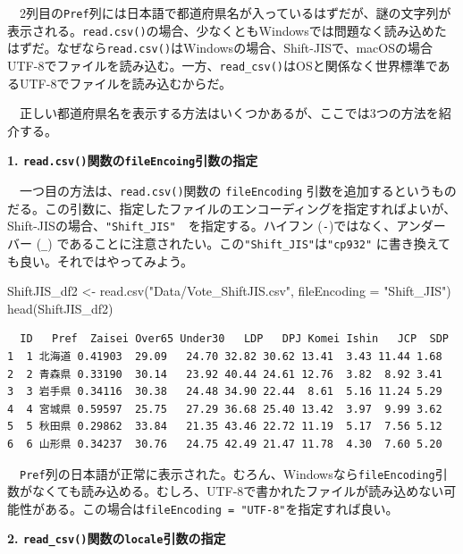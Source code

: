\documentclass[
  a4paper,
  pandoc,
  ja=standard,
  jafont=haranoaji]{bxjsbook}
\newenvironment{Shaded}{\begin{snugshade}}{\end{snugshade}}
\newcommand{\AttributeTok}[1]{\textcolor[rgb]{0.00,0.48,0.65}{#1}}
\newcommand{\FunctionTok}[1]{\textcolor[rgb]{0.28,0.35,0.67}{#1}}
\newcommand{\NormalTok}[1]{\textcolor[rgb]{0.00,0.48,0.65}{#1}}
\newcommand{\OtherTok}[1]{\textcolor[rgb]{0.00,0.48,0.65}{#1}}
\newcommand{\StringTok}[1]{\textcolor[rgb]{0.13,0.47,0.30}{#1}}
\begin{document}
　2列目の\texttt{Pref}列には日本語で都道府県名が入っているはずだが、謎の文字列が表示される。\texttt{read.csv()}の場合、少なくともWindowsでは問題なく読み込めたはずだ。なぜなら\texttt{read.csv()}はWindowsの場合、Shift-JISで、macOSの場合UTF-8でファイルを読み込む。一方、\texttt{read\_csv()}はOSと関係なく世界標準であるUTF-8でファイルを読み込むからだ。

　正しい都道府県名を表示する方法はいくつかあるが、ここでは3つの方法を紹介する。

\textbf{1. \texttt{read.csv()}関数の\texttt{fileEncoing}引数の指定}

　一つ目の方法は、\texttt{read.csv()}関数の \texttt{fileEncoding}
引数を追加するというものだる。この引数に、指定したファイルのエンコーディングを指定すればよいが、Shift-JISの場合、\texttt{"Shift\_JIS"}　を指定する。ハイフン
(\texttt{-})ではなく、アンダーバー (\texttt{\_})
であることに注意されたい。この\texttt{"Shift\_JIS"}は\texttt{"cp932"}
に書き換えても良い。それではやってみよう。

\begin{Shaded}
\begin{Highlighting}[numbers=left,,]
\NormalTok{ShiftJIS\_df2 }\OtherTok{\textless{}{-}} \FunctionTok{read.csv}\NormalTok{(}\StringTok{"Data/Vote\_ShiftJIS.csv"}\NormalTok{, }
                         \AttributeTok{fileEncoding =} \StringTok{"Shift\_JIS"}\NormalTok{)}
\FunctionTok{head}\NormalTok{(ShiftJIS\_df2)}
\end{Highlighting}
\end{Shaded}

\begin{verbatim}
  ID   Pref  Zaisei Over65 Under30   LDP   DPJ Komei Ishin   JCP  SDP
1  1 北海道 0.41903  29.09   24.70 32.82 30.62 13.41  3.43 11.44 1.68
2  2 青森県 0.33190  30.14   23.92 40.44 24.61 12.76  3.82  8.92 3.41
3  3 岩手県 0.34116  30.38   24.48 34.90 22.44  8.61  5.16 11.24 5.29
4  4 宮城県 0.59597  25.75   27.29 36.68 25.40 13.42  3.97  9.99 3.62
5  5 秋田県 0.29862  33.84   21.35 43.46 22.72 11.19  5.17  7.56 5.12
6  6 山形県 0.34237  30.76   24.75 42.49 21.47 11.78  4.30  7.60 5.20
\end{verbatim}

　\texttt{Pref}列の日本語が正常に表示された。むろん、Windowsなら\texttt{fileEncoding}引数がなくても読み込める。むしろ、UTF-8で書かれたファイルが読み込めない可能性がある。この場合は\texttt{fileEncoding\ =\ "UTF-8"}を指定すれば良い。

\textbf{2. \texttt{read\_csv()}関数の\texttt{locale}引数の指定}
\end{document}
